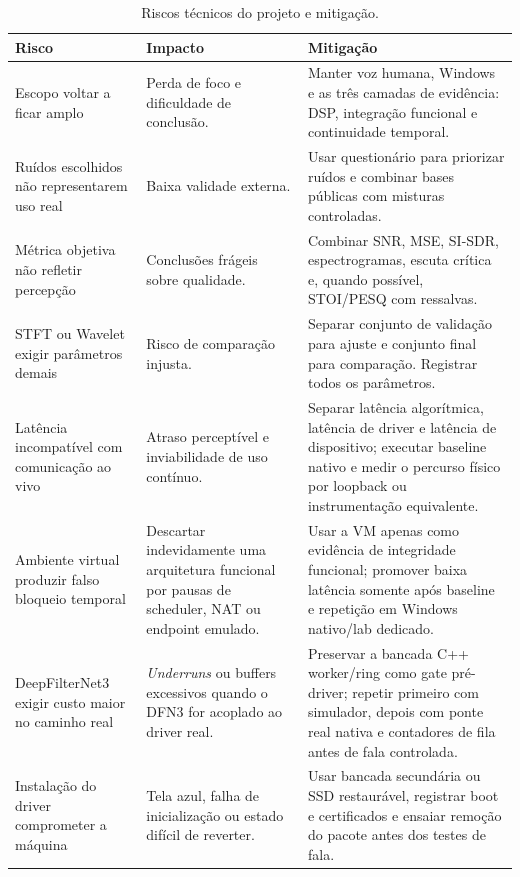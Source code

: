 \begin{table}[!htbp]
\centering
\caption{Riscos técnicos do projeto e mitigação.}
\label{tab:riscos}
\footnotesize
{}
\begin{tabularx}{\textwidth}{>{\raggedright\arraybackslash}p{4.0cm}XX}
\toprule
\textbf{Risco} & \textbf{Impacto} & \textbf{Mitigação} \\
\midrule
Escopo voltar a ficar amplo & Perda de foco e dificuldade de conclusão. & Manter voz humana, Windows e as três camadas de evidência: DSP, integração funcional e continuidade temporal. \\
\addlinespace
Ruídos escolhidos não representarem uso real & Baixa validade externa. & Usar questionário para priorizar ruídos e combinar bases públicas com misturas controladas. \\
\addlinespace
Métrica objetiva não refletir percepção & Conclusões frágeis sobre qualidade. & Combinar SNR, MSE, SI-SDR, espectrogramas, escuta crítica e, quando possível, STOI/PESQ com ressalvas. \\
\addlinespace
STFT ou Wavelet exigir parâmetros demais & Risco de comparação injusta. & Separar conjunto de validação para ajuste e conjunto final para comparação. Registrar todos os parâmetros. \\
\addlinespace
Latência incompatível com comunicação ao vivo & Atraso perceptível e inviabilidade de uso contínuo. & Separar latência algorítmica, latência de driver e latência de dispositivo; executar baseline nativo e medir o percurso físico por loopback ou instrumentação equivalente. \\
\addlinespace
Ambiente virtual produzir falso bloqueio temporal & Descartar indevidamente uma arquitetura funcional por pausas de scheduler, NAT ou endpoint emulado. & Usar a VM apenas como evidência de integridade funcional; promover baixa latência somente após baseline e repetição em Windows nativo/lab dedicado. \\
\addlinespace
DeepFilterNet3 exigir custo maior no caminho real & \textit{Underruns} ou buffers excessivos quando o DFN3 for acoplado ao driver real. & Preservar a bancada C++ worker/ring como gate pré-driver; repetir primeiro com simulador, depois com ponte real nativa e contadores de fila antes de fala controlada. \\
\addlinespace
Instalação do driver comprometer a máquina & Tela azul, falha de inicialização ou estado difícil de reverter. & Usar bancada secundária ou SSD restaurável, registrar boot e certificados e ensaiar remoção do pacote antes dos testes de fala. \\

\end{tabularx}
\end{table}
